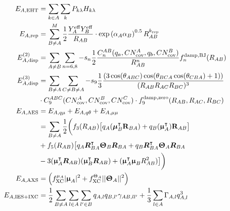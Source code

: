 \begin{subequations}
\begin{align}
    E_{A,\mathrm{EHT}} &= \sum_{k \in A} \sum_k P_{k\lambda} H_{k\lambda}\\
    E_{A,\mathrm{rep}} &= \sum_{B \neq A}^{M} \dfrac{1}{2} \dfrac{Y_{A}^\mathrm{eff}Y_{B}^\mathrm{eff}}{R_{AB}}
    \cdot \exp \left(\alpha_A \alpha_B \right)^{0.5} R_{AB}^{k_\mathrm{rep}}\\
    E_{A,\mathrm{disp}}^{(2)} &= \sum_{A \neq B} \sum_{n=6,8} -s_n \dfrac{1}{2}
    \dfrac{C_n^{AB}(q_a,CN_\mathrm{cov}^A,q_b,CN_\mathrm{cov}^B)}{R_{AB}^n} f_{n}^\mathrm{damp,BJ}(R_{AB})\\
    E_{A,\mathrm{disp}}^{(3)} &= \sum_{B \neq A} \sum_{C \neq B \neq A} 
    -s_9 \dfrac{1}{3} 
    \dfrac{(3 \cos(\theta_{ABC}) \cos(\theta_{BCA} \cos(\theta_{CBA}) + 1))}{(R_{AB}R_{AC}R_{BC})^3} \nonumber\\ 
    &\cdot  C_9^{ABC}(CN_\mathrm{cov}^A,CN_\mathrm{cov}^B,CN_\mathrm{cov}^C) \cdot 
    f_{9}^\mathrm{damp,zero}(R_{AB},R_{AC},R_{BC})\\
    E_{A,\mathrm{AES}} &= E_{A,q\mu} + E_{A,q\theta} + E_{A,\mu\mu} \nonumber \\
    &= \sum_{B \neq A} \dfrac{1}{2} \bigg(f_3(R_{AB})\big[q_A(\bm{\mu}_B^\intercal\textbf{R}_{BA}) + q_B (\bm{\upmu}_A^\intercal)\textbf{R}_{AB} \big] \nonumber\\
    &+ f_5(R_{AB}) \big[q_A\bm{R}_{BA}^\intercal \bm{\Uptheta}_B \bm{R}_{BA} +q_B\bm{R}_{BA}^\intercal \bm{\Uptheta}_A \bm{R}_{BA} \nonumber \\
    &- 3 (\bm{\upmu}_A^\intercal\bm{R}_{AB})(\bm{\upmu}_B^\intercal\bm{R}_{AB}) +  (\bm{\upmu}_A^\intercal \bm{\upmu}_B R_{AB}^2)  \big] \bigg)\\
    E_{A,\mathrm{AXS}} &= \left( f_\mathrm{XC}^{\mu_A}|\bm{\upmu}_A|^2  + f_\mathrm{XC}^{\Theta_A}||\bm{\Uptheta}_A||^2  \right) \\
    E_{A,\mathrm{IES+IXC}} &= \dfrac{1}{2} \sum_{B \neq A} \sum_{l \in A} \sum_{l' \in B} q_{A,l} q_{B,l'} \gamma_{AB,ll'} + \dfrac{1}{3} \sum_{l \in A} \Gamma_{A,l} q_{A,l}^3
\end{align}
\end{subequations}

